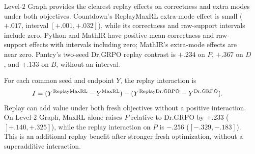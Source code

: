 \documentclass{article}
\newcommand{\1}{\mathbf 1}
\theoremstyle{remark}
\theoremstyle{definition}
\theoremstyle{plain}
\begin{document}
\begin{table}[H]
  \centering
  \caption{\textbf{Replay effects on the harder Level-2 tasks at pass 8.}
  MaxRL and Dr.GRPO identify the fresh objective; each effect is its replay
  variant minus the corresponding objective without replay. Each row uses
  its own pairwise intersection, which can exceed the four-method
  intersection. Brackets give paired Student-$t$ intervals for $\Delta B$
  only when all five registered pairs are available.}
  \label{tab:current-e119}
  \scriptsize
  \setlength{\tabcolsep}{3pt}
\end{table}


Level-2 Graph provides the clearest replay effects on correctness and extra
modes under both objectives. Countdown's ReplayMaxRL extra-mode effect is
small ($+.017$, interval $[+.001,+.032]$), while its correctness and raw-support
intervals include zero. Python and MathIR have positive mean correctness
and raw-support effects with intervals including zero; MathIR's extra-mode
effects are near zero. Pantry's two-seed Dr.GRPO replay contrast is
$+.234$ on $P$, $+.367$ on $D$, and $+.133$ on $B$, without an interval.

For each common seed and endpoint $Y$, the replay interaction is
\[
 I=(Y^{\rm ReplayMaxRL}-Y^{\rm MaxRL})
    -(Y^{\rm ReplayDr.GRPO}-Y^{\rm Dr.GRPO}).
\]
Replay can add value under both fresh objectives without a positive
interaction. On Level-2 Graph, MaxRL alone raises $P$ relative to Dr.GRPO
by $+.233$ ($[+.140,+.325]$), while the replay interaction on $P$ is
$-.256$ ($[-.329,-.183]$). This is an additional replay benefit after
stronger fresh optimization, without a superadditive interaction.

\begin{table}[H]
  \centering
  \caption{\textbf{Fresh-objective effects and replay interactions on Level 2.}
  All three contrasts within a domain use the same four-arm seed
  intersection. The interaction is
  $(\mathrm{ReplayMaxRL}-\mathrm{MaxRL})-
  (\mathrm{ReplayDr.GRPO}-\mathrm{Dr.GRPO})$.
  Each entry gives its mean and, only for a complete five-seed block, a
  paired unadjusted 95\% Student-$t$ interval. Archived four-arm exports:
  \href{https://huggingface.co/od2961/maxent-grpo-models/blob/main/experiments/E119/README.md\#models}{E119 model index}.}
  \label{tab:level2-factorial-contrasts}
  \scriptsize
  \setlength{\tabcolsep}{3pt}
\end{table}
\end{document}
